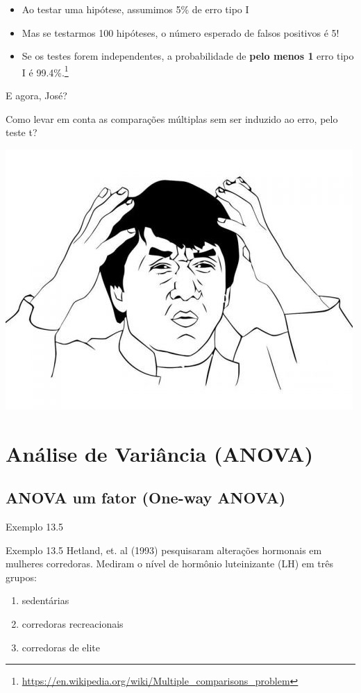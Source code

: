 \documentclass{beamer}
\begin{document}
\begin{frame}{\scriptsize }
  \begin{itemize}
    \footnotesize
  \item Ao testar uma hipótese, assumimos 5\% de erro tipo I
    \bigskip
    \bigskip
  \item Mas se testarmos 100 hipóteses, o número esperado de falsos positivos é 5!
  \item Se os testes forem independentes, a probabilidade de {\bf pelo menos 1} erro tipo I é 99.4\%.\footnote{\tiny \url{https://en.wikipedia.org/wiki/Multiple_comparisons_problem}}
  \end{itemize}
\end{frame}

\begin{frame}{\scriptsize E agora, José?}
  \begin{block}{}
    Como levar em conta as comparações múltiplas sem ser induzido ao erro, pelo teste t?
  \end{block}
  \bigskip
  \begin{center}
    \includegraphics[width=.4\textwidth]{Cap10-11/Jackie-Chan-WTF}
  \end{center}
\end{frame}


\section[ANOVA]{Análise de Variância (ANOVA)}

\subsection{ANOVA um fator (One-way ANOVA)}

\begin{frame}[label=exemplo13.5-enunciado]{\scriptsize Exemplo 13.5}
  \begin{exampleblock}{Exemplo 13.5}
    \footnotesize
    Hetland, et. al (1993) pesquisaram alterações hormonais em mulheres corredoras.
    Mediram o nível de hormônio luteinizante (LH) em três grupos:
    \bigskip
    \begin{enumerate}
      \footnotesize
    \item sedentárias
    \item corredoras recreacionais
    \item corredoras de elite
    \end{enumerate}
  \end{exampleblock}
\end{frame}
\end{document}
